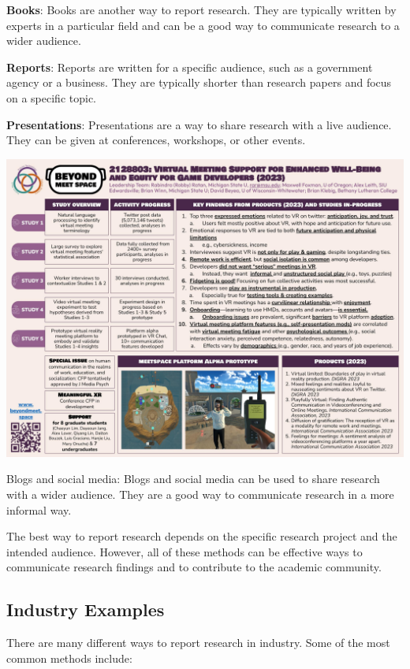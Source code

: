 \documentclass[
  b5paper]{book}
\begin{document}
\textbf{Books}: Books are another way to report research. They are typically written by experts in a particular field and can be a good way to communicate research to a wider audience.

\textbf{Reports}: Reports are written for a specific audience, such as a government agency or a business. They are typically shorter than research papers and focus on a specific topic.

\textbf{Presentations}: Presentations are a way to share research with a live audience. They can be given at conferences, workshops, or other events.

\includegraphics[width=1\textwidth,height=\textheight]{images/BMS 2023 poster final.jpg}

Blogs and social media: Blogs and social media can be used to share research with a wider audience. They are a good way to communicate research in a more informal way.

The best way to report research depends on the specific research project and the intended audience. However, all of these methods can be effective ways to communicate research findings and to contribute to the academic community.

\hypertarget{industry-examples}{%
\subsection*{Industry Examples}\label{industry-examples}}

There are many different ways to report research in industry. Some of the most common methods include:
\end{document}
